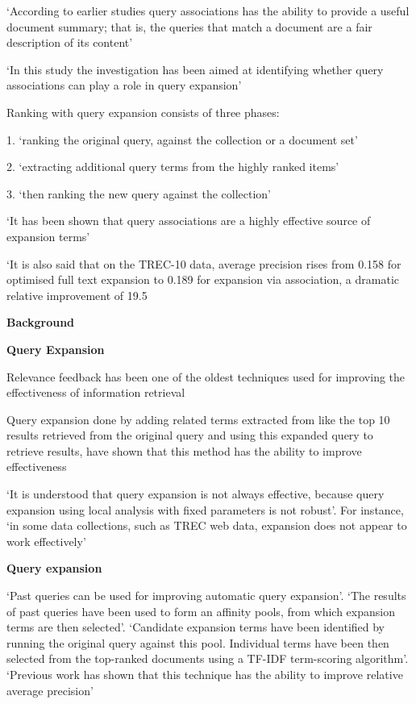 \documentclass[]{article}
\begin{document}
{{‘According to earlier studies query associations has the ability to provide a useful document summary; that is, the queries that match a document are a fair description of its content’

‘In this study the investigation has been aimed at identifying whether query associations can play a role in query expansion’

Ranking with query expansion consists of three phases: 

1.	‘ranking the original query, against the collection or a document set’

2.	‘extracting additional query terms from the highly ranked items’

3.	‘then ranking the new query against the collection’

‘It has been shown that query associations are a highly effective source of expansion terms’

‘It is also said that on the TREC-10 data, average precision rises from 0.158 for optimised full text expansion to 0.189 for expansion via association, a dramatic relative improvement of 19.5%

\textbf{Background}

\textbf{Query Expansion}

Relevance feedback has been one of the oldest techniques used for improving the effectiveness of information retrieval

Query expansion done by adding related terms extracted from like the top 10 results retrieved from the original query and using this expanded query to retrieve results, have shown that this method has the ability to improve effectiveness

‘It is understood that query expansion is not always effective, because query expansion using local analysis with fixed parameters is not robust’. For instance, ‘in some data collections, such as TREC web data, expansion does not appear to work effectively’

\textbf{Query expansion}

‘Past queries can be used for improving automatic query expansion’. ‘The results of past queries have been used to form an affinity pools, from which expansion terms are then selected’. ‘Candidate expansion terms have been identified by running the original query against this pool. Individual terms have been then selected from the top-ranked documents using a TF-IDF term-scoring algorithm’. ‘Previous work has shown that this technique has the ability to improve relative average precision’

}}
\end{document}

